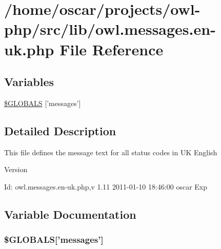 \section{/home/oscar/projects/owl-\/php/src/lib/owl.messages.en-\/uk.php File Reference}
\label{owl_8messages_8en-uk_8php}
\subsection*{Variables}
\begin{DoxyCompactItemize}
\item 
\hyperlink{owl_8messages_8en-uk_8php_a65f2996116eed36e9ab25f254a470259}{\$GLOBALS} \mbox{[}'messages'\mbox{]}
\end{DoxyCompactItemize}


\subsection{Detailed Description}
This file defines the message text for all status codes in UK English \begin{DoxyVersion}{Version}

\end{DoxyVersion}
\begin{DoxyParagraph}{Id:}
owl.messages.en-\/uk.php,v 1.11 2011-\/01-\/10 18:46:00 oscar Exp 
\end{DoxyParagraph}


\subsection{Variable Documentation}
\subsubsection[{\$GLOBALS}]{\setlength{\rightskip}{0pt plus 5cm}\$GLOBALS\mbox{[}'messages'\mbox{]}}\label{owl_8messages_8en-uk_8php_a65f2996116eed36e9ab25f254a470259}
